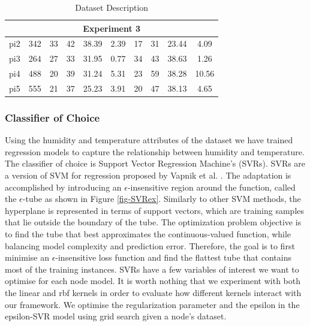 \documentclass{mprop}
\begin{document}
\begin{table}[]
\begin{tabular}{|cccccccccc|}
\multicolumn{10}{|c|}{\textbf{Experiment 3}}                                                                                                                                   \\ \hline
\multicolumn{1}{|c|}{pi2}           & \multicolumn{1}{c|}{342}                     & 33  & 42  & 38.39 & \multicolumn{1}{c|}{2.39} & 17      & 31      & 23.44     & 4.09      \\
\multicolumn{1}{|c|}{pi3}           & \multicolumn{1}{c|}{264}                     & 27  & 33  & 31.95 & \multicolumn{1}{c|}{0.77} & 34      & 43      & 38.63     & 1.26      \\
\multicolumn{1}{|c|}{pi4}           & \multicolumn{1}{c|}{488}                     & 20  & 39  & 31.24 & \multicolumn{1}{c|}{5.31} & 23      & 59      & 38.28     & 10.56     \\
\multicolumn{1}{|c|}{pi5}           & \multicolumn{1}{c|}{555}                     & 21  & 37  & 25.23 & \multicolumn{1}{c|}{3.91} & 20      & 47      & 38.13     & 4.65      \\ \hline
\end{tabular}
\caption{\label{tab:Data Description}Dataset Description}
\end{table}

\subsubsection{Classifier of Choice}

Using the humidity and temperature attributes of the dataset we have trained regression models to capture the relationship between humidity and temperature. The classifier of choice is Support Vector Regression Machine's (SVRs). SVRs are a version of SVM for regression proposed by Vapnik et al. \cite{OriginalSVR}. The adaptation is accomplished by introducing an $\epsilon$-insensitive region around the function, called the $\epsilon$-tube as shown in Figure \ref{fig-SVRex}. Similarly to other SVM methods, the hyperplane is represented in terms of support vectors, which are training samples that lie outside the boundary of the tube.  The optimization problem objective is to find the tube that best approximates the continuous-valued function, while balancing model complexity and prediction error. Therefore, the goal is to first minimise an $\epsilon$-insensitive loss function and find the flattest tube that contains most of the training instances. SVRs have a few variables of interest we want to optimise for each node model. It is worth nothing that we experiment with both the linear and rbf kernels in order to evaluate how different kernels interact with our framework. We optimise the regularization parameter and the epsilon in the epsilon-SVR model using grid search given a node's dataset.
\end{document}
